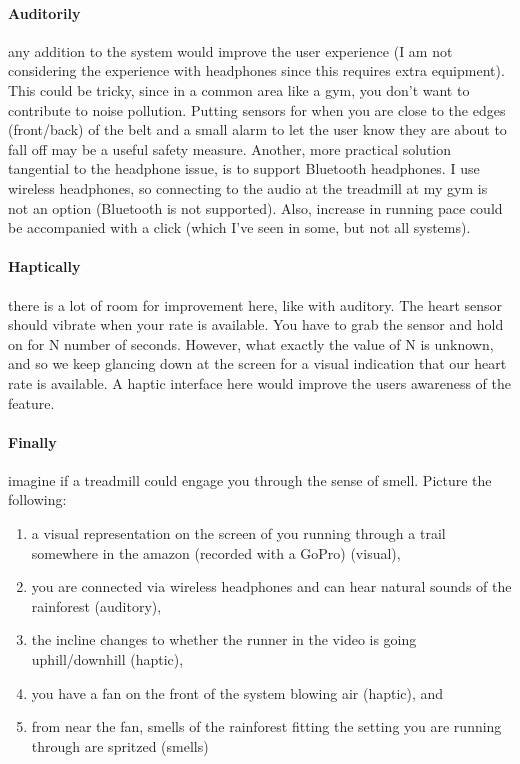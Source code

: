 \paragraph{Auditorily}
any addition to the system would improve the user experience (I am not considering the experience with headphones since this requires extra equipment). This could be tricky, since in a common area like a gym, you don't want to contribute to noise pollution. Putting sensors for when you are close to the edges (front/back) of the belt and a small alarm to let the user know they are about to fall off may be a useful safety measure. Another, more practical solution tangential to the headphone issue, is to support Bluetooth headphones. I use wireless headphones, so connecting to the audio at the treadmill at my gym is not an option (Bluetooth is not supported). Also, increase in running pace could be accompanied with a click (which I've seen in some, but not all systems).

\paragraph{Haptically}
there is a lot of room for improvement here, like with auditory. The heart sensor should vibrate when your rate is available. You have to grab the sensor and hold on for N number of seconds. However, what exactly the value of N is unknown, and so we keep glancing down at the screen for a visual indication that our heart rate is available. A haptic interface here would improve the users awareness of the feature.

\paragraph{Finally}
imagine if a treadmill could engage you through the sense of smell. Picture the following:

\begin{enumerate}
\item
  a visual representation on the screen of you running through a trail somewhere in the amazon (recorded with a GoPro) (visual),
\item
  you are connected via wireless headphones and can hear natural sounds of the rainforest (auditory),
\item
  the incline changes to whether the runner in the video is going uphill/downhill (haptic),
\item
  you have a fan on the front of the system blowing air (haptic), and
\item
  from near the fan, smells of the rainforest fitting the setting you are running through are spritzed (smells)
\end{enumerate}

